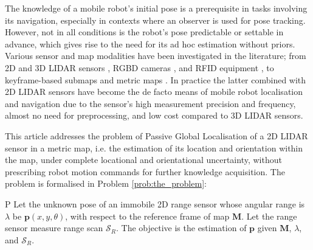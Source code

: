 The knowledge of a mobile robot's initial pose is a prerequisite in tasks
involving its navigation, especially in contexts where an observer is used for
pose tracking. However, not in all conditions is the robot's pose predictable
or settable in advance, which gives rise to the need for its ad hoc estimation
without priors. Various sensor and map modalities have been investigated in the
literature; from 2D and 3D LIDAR sensors \cite{als_eth,Cop2018a}, RGBD cameras
\cite{Guo2016}, and RFID equipment \cite{Tzitzis2023b}, to keyframe-based
submaps \cite{Lowry2016} and metric maps \cite{Rosen2021}. In practice the
latter combined with 2D LIDAR sensors have become the de facto means of mobile
robot localisation and navigation due to the sensor's high measurement
precision and frequency, almost no need for preprocessing, and low cost
compared to 3D LIDAR sensors.

This article addresses the problem of Passive Global Localisation of a 2D LIDAR
sensor in a metric map, i.e. the estimation of its location and orientation
within the map, under complete locational and orientational uncertainty,
without prescribing robot motion commands
for further knowledge acquisition. The problem is
formalised in Problem \ref{prob:the_problem}:

\begin{customprb}{P}
  \label{prob:the_problem}
  Let the unknown pose of an immobile 2D range sensor whose angular range is
  $\lambda$ be $\bm{p}(x,y,\theta)$, with respect to the
  reference frame of map $\bm{M}$. Let the range sensor measure range scan
  $\mathcal{S}_R$. The objective is the estimation of $\bm{p}$ given $\bm{M}$,
  $\lambda$, and $\mathcal{S}_R$.
\end{customprb}

